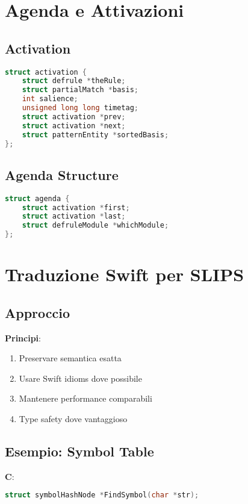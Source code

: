 \section{Agenda e Attivazioni}

\subsection{Activation}

\begin{lstlisting}[language=C]
struct activation {
    struct defrule *theRule;
    struct partialMatch *basis;
    int salience;
    unsigned long long timetag;
    struct activation *prev;
    struct activation *next;
    struct patternEntity *sortedBasis;
};
\end{lstlisting}

\subsection{Agenda Structure}

\begin{lstlisting}[language=C]
struct agenda {
    struct activation *first;
    struct activation *last;
    struct defruleModule *whichModule;
};
\end{lstlisting}

\section{Traduzione Swift per SLIPS}

\subsection{Approccio}

\textbf{Principi}:
\begin{enumerate}
\item Preservare semantica esatta
\item Usare Swift idioms dove possibile
\item Mantenere performance comparabili
\item Type safety dove vantaggioso
\end{enumerate}

\subsection{Esempio: Symbol Table}

\textbf{C}:
\begin{lstlisting}[language=C]
struct symbolHashNode *FindSymbol(char *str);
\end{lstlisting}

